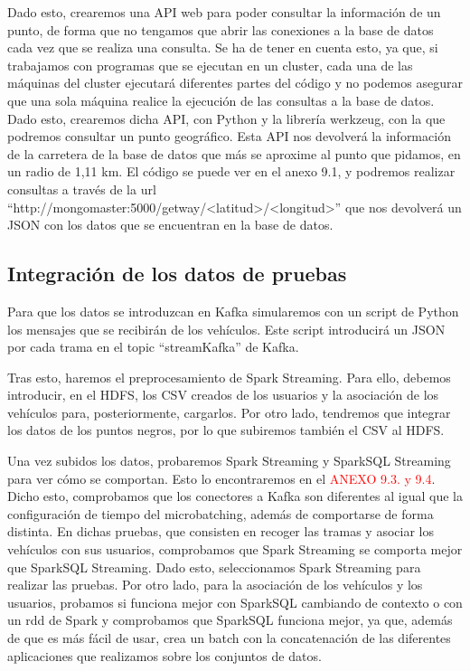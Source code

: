 Dado esto, crearemos una API web para poder consultar la información de un punto, de forma que no tengamos que abrir las conexiones a la base de datos cada vez que se realiza una consulta. Se ha de tener en cuenta esto, ya que, si trabajamos con programas que se ejecutan en un cluster, cada una de las máquinas del cluster ejecutará diferentes partes del código y no podemos asegurar que una sola máquina realice la ejecución de las consultas a la base de datos. Dado esto, crearemos dicha API, con Python y la librería werkzeug, con la que podremos consultar un punto geográfico. Esta API nos devolverá la información de la carretera de la base de datos que más se aproxime al punto que pidamos, en un radio de 1,11 km. El código se puede ver en el anexo 9.1, y podremos realizar consultas a través de la url “http://mongomaster:5000/getway/<latitud>/<longitud>” que nos devolverá un JSON con los datos que se encuentran en la base de datos.

\subsection {Integración de los datos de pruebas \label{integracion}}

Para que los datos se introduzcan en Kafka simularemos con un script de Python los mensajes que se recibirán de los vehículos. Este script introducirá un JSON por cada trama en el topic “streamKafka” de Kafka.

Tras esto, haremos el preprocesamiento de Spark Streaming. Para ello, debemos introducir, en el HDFS, los CSV creados de los usuarios y la asociación de los vehículos para, posteriormente, cargarlos. Por otro lado, tendremos que integrar los datos de los puntos negros, por lo que subiremos también el CSV al HDFS.

Una vez subidos los datos, probaremos Spark Streaming y SparkSQL Streaming para ver cómo se comportan. Esto lo encontraremos en el \textcolor{red}{ANEXO 9.3. y 9.4}. Dicho esto, comprobamos que los conectores a Kafka son diferentes al igual que la configuración de tiempo del microbatching, además de comportarse de forma distinta. En dichas pruebas, que consisten en recoger las tramas y asociar los vehículos con sus usuarios, comprobamos que Spark Streaming se comporta mejor que SparkSQL Streaming. Dado esto, seleccionamos Spark Streaming para realizar las pruebas. Por otro lado, para la asociación de los vehículos y los usuarios, probamos si funciona mejor con SparkSQL cambiando de contexto o con un rdd de Spark y comprobamos que SparkSQL funciona mejor, ya que, además de que es más fácil de usar, crea un batch con la concatenación de las diferentes aplicaciones que realizamos sobre los conjuntos de datos.

